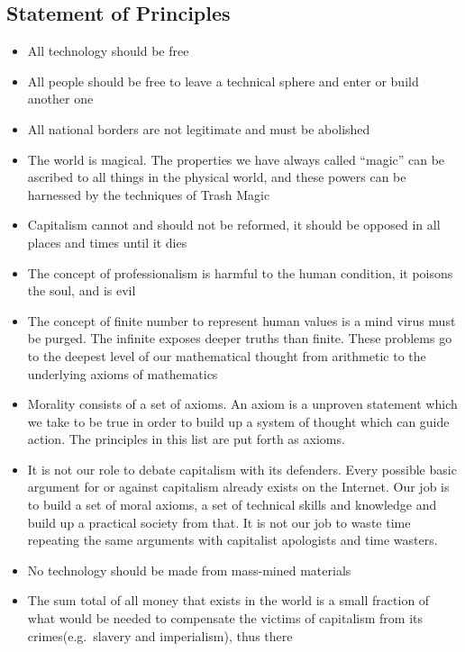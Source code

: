 \subsection{Statement of Principles}\label{statement-of-principles}

\begin{itemize}
\tightlist
\item
  All technology should be free
\item
  All people should be free to leave a technical sphere and enter or
  build another one
\item
  All national borders are not legitimate and must be abolished
\item
  The world is magical. The properties we have always called ``magic''
  can be ascribed to all things in the physical world, and these powers
  can be harnessed by the techniques of Trash Magic
\item
  Capitalism cannot and should not be reformed, it should be opposed in
  all places and times until it dies
\item
  The concept of professionalism is harmful to the human condition, it
  poisons the soul, and is evil\\
\item
  The concept of finite number to represent human values is a mind virus
  must be purged. The infinite exposes deeper truths than finite. These
  problems go to the deepest level of our mathematical thought from
  arithmetic to the underlying axioms of mathematics
\item
  Morality consists of a set of axioms. An axiom is a unproven statement
  which we take to be true in order to build up a system of thought
  which can guide action. The principles in this list are put forth as
  axioms.
\item
  It is not our role to debate capitalism with its defenders. Every
  possible basic argument for or against capitalism already exists on
  the Internet. Our job is to build a set of moral axioms, a set of
  technical skills and knowledge and build up a practical society from
  that. It is not our job to waste time repeating the same arguments
  with capitalist apologists and time wasters.
\item
  No technology should be made from mass-mined materials
\item
  The sum total of all money that exists in the world is a small
  fraction of what would be needed to compensate the victims of
  capitalism from its crimes(e.g.~slavery and imperialism), thus there

\end{itemize}
